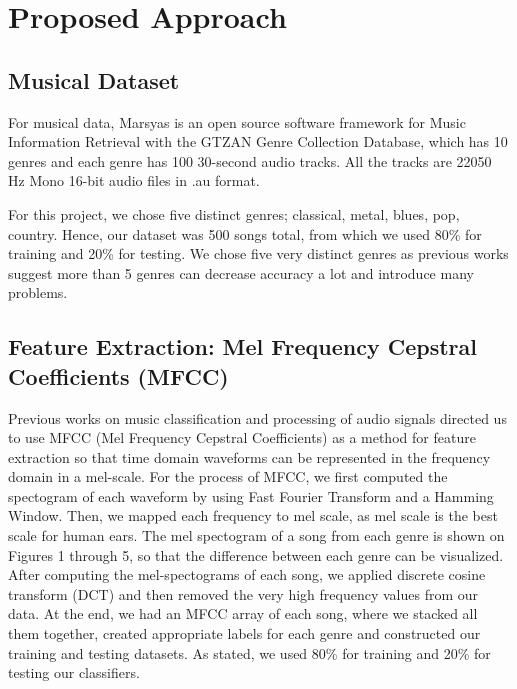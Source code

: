 \section{Proposed Approach}\label{sec:approach}
\subsection{Musical Dataset}
For musical data, Marsyas is an open source software framework for Music Information Retrieval with the GTZAN Genre Collection Database, which has 10 genres and each genre has 100 30-second audio tracks. All the tracks are 22050 Hz Mono 16-bit audio files in .au format. 

For this project, we chose five distinct genres; classical, metal, blues, pop, country. Hence, our dataset was 500 songs total, from which we used 80\% for training and 20\% for testing. We chose five very distinct genres as previous works \cite{Chun:2010} suggest more than 5 genres can decrease accuracy a lot and introduce many problems. 

\subsection{Feature Extraction: Mel Frequency Cepstral Coefficients (MFCC)}
Previous works \cite{MFCC:2011} on music classification and processing of audio signals directed us to use MFCC (Mel Frequency Cepstral Coefficients) as a method for feature extraction so that time domain waveforms can be represented in the frequency domain in a mel-scale. For the process of MFCC, we first computed the spectogram of each waveform by using Fast Fourier Transform and a Hamming Window. Then, we mapped each frequency to mel scale, as mel scale is the best scale for human ears. The mel spectogram of a song from each genre is shown on Figures 1 through 5, so that the difference between each genre can be visualized. After computing the mel-spectograms of each song, we applied discrete cosine transform (DCT) and then removed the very high frequency values from our data. At the end, we had an MFCC array of each song, where we stacked all them together, created appropriate labels for each genre and constructed our training and testing datasets. As stated, we used 80\% for training and 20\% for testing our classifiers. 


